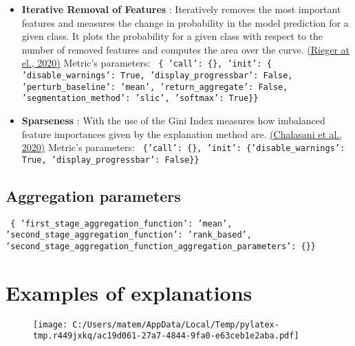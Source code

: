 \documentclass{article}%
\begin{document}
\begin{itemize}
{                'similarity\_func': difference\}\} \newline%
%
}%
\item%
\textbf{Iterative Removal of Features}%
: Iteratively removes the most important features and measures the change in probability in the model prediction for a given class. It plots the probability for a given class with respect to the number of removed features and computes the area over the curve.%
\href{https://arxiv.org/abs/2003.08747}{(Rieger at el., 2020)}%
\newline%
%
Metric's parameters: \newline%
%
\texttt{%
\{   'call': \{\},\newline%
    'init': \{   'disable\_warnings': True,\newline%
                'display\_progressbar': False,\newline%
                'perturb\_baseline': 'mean',\newline%
                'return\_aggregate': False,\newline%
                'segmentation\_method': 'slic',\newline%
                'softmax': True\}\} \newline%
%
}%
\item%
\textbf{Sparseness}%
: With the use of the Gini Index measures how imbalanced feature importances given by the explanation method are.%
\href{https://arxiv.org/abs/1810.06583}{(Chalasani et al., 2020)}%
\newline%
%
Metric's parameters: \newline%
%
\texttt{%
\{'call': \{\}, 'init': \{'disable\_warnings': True, 'display\_progressbar': False\}\} \newline%
%
}%
\end{itemize}

%
\subsection*{Aggregation parameters}%
\label{subsec:Aggregationparameters}%
\texttt{%
\{   'first\_stage\_aggregation\_function': 'mean',\newline%
    'second\_stage\_aggregation\_function': 'rank\_based',\newline%
    'second\_stage\_aggregation\_function\_aggregation\_parameters': \{\}\}%
}

%
\newpage%
\section*{Examples of explanations}%
\label{sec:Examplesofexplanations}%


\begin{figure}[!h]%
\centering%
\texttt{[image: C:/Users/matem/AppData/Local/Temp/pylatex-tmp.r449jxkq/ac19d061-27a7-4844-9fa0-e63ceb1e2aba.pdf]}%
\end{figure}

%
\end{document}

